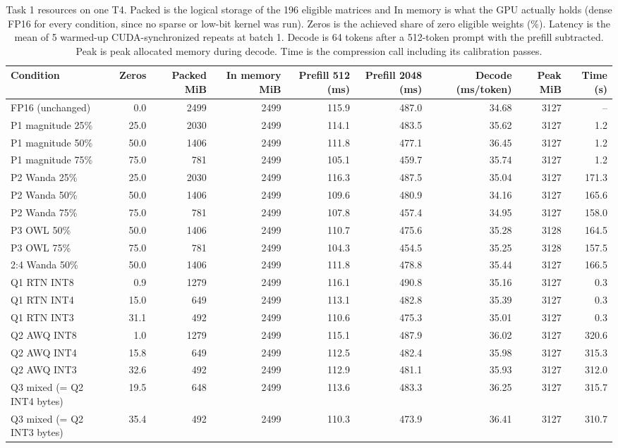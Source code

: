\begin{table}[!htb]
\centering
\scriptsize
\setlength{\tabcolsep}{3.5pt}
\caption{Task 1 resources on one T4. Packed is the logical storage of the 196 eligible matrices and In memory is what the GPU actually holds (dense FP16 for every condition, since no sparse or low-bit kernel was run). Zeros is the achieved share of zero eligible weights (\%). Latency is the mean of 5 warmed-up CUDA-synchronized repeats at batch 1. Decode is 64 tokens after a 512-token prompt with the prefill subtracted. Peak is peak allocated memory during decode. Time is the compression call including its calibration passes.}
\label{tab:t1res}
\begin{adjustbox}{max width=\linewidth}
\begin{tabular}{lrrrrrrrr}
\toprule
Condition & Zeros & Packed MiB & In memory MiB & Prefill 512 (ms) & Prefill 2048 (ms) & Decode (ms/token) & Peak MiB & Time (s) \\
\midrule
FP16 (unchanged) & 0.0 & 2499 & 2499 & 115.9 & 487.0 & 34.68 & 3127 & -- \\
P1 magnitude 25\% & 25.0 & 2030 & 2499 & 114.1 & 483.5 & 35.62 & 3127 & 1.2 \\
P1 magnitude 50\% & 50.0 & 1406 & 2499 & 111.8 & 477.1 & 36.45 & 3127 & 1.2 \\
P1 magnitude 75\% & 75.0 & 781 & 2499 & 105.1 & 459.7 & 35.74 & 3127 & 1.2 \\
P2 Wanda 25\% & 25.0 & 2030 & 2499 & 116.3 & 487.5 & 35.04 & 3127 & 171.3 \\
P2 Wanda 50\% & 50.0 & 1406 & 2499 & 109.6 & 480.9 & 34.16 & 3127 & 165.6 \\
P2 Wanda 75\% & 75.0 & 781 & 2499 & 107.8 & 457.4 & 34.95 & 3127 & 158.0 \\
P3 OWL 50\% & 50.0 & 1406 & 2499 & 110.7 & 475.6 & 35.28 & 3128 & 164.5 \\
P3 OWL 75\% & 75.0 & 781 & 2499 & 104.3 & 454.5 & 35.25 & 3128 & 157.5 \\
2:4 Wanda 50\% & 50.0 & 1406 & 2499 & 111.8 & 478.8 & 35.44 & 3127 & 166.5 \\
Q1 RTN INT8 & 0.9 & 1279 & 2499 & 116.1 & 490.8 & 35.16 & 3127 & 0.3 \\
Q1 RTN INT4 & 15.0 & 649 & 2499 & 113.1 & 482.8 & 35.39 & 3127 & 0.3 \\
Q1 RTN INT3 & 31.1 & 492 & 2499 & 110.6 & 475.3 & 35.01 & 3127 & 0.3 \\
Q2 AWQ INT8 & 1.0 & 1279 & 2499 & 115.1 & 487.9 & 36.02 & 3127 & 320.6 \\
Q2 AWQ INT4 & 15.8 & 649 & 2499 & 112.5 & 482.4 & 35.98 & 3127 & 315.3 \\
Q2 AWQ INT3 & 32.6 & 492 & 2499 & 112.9 & 481.1 & 35.93 & 3127 & 312.0 \\
Q3 mixed (= Q2 INT4 bytes) & 19.5 & 648 & 2499 & 113.6 & 483.3 & 36.25 & 3127 & 315.7 \\
Q3 mixed (= Q2 INT3 bytes) & 35.4 & 492 & 2499 & 110.3 & 473.9 & 36.41 & 3127 & 310.7 \\
\bottomrule
\end{tabular}
\end{adjustbox}
\end{table}
